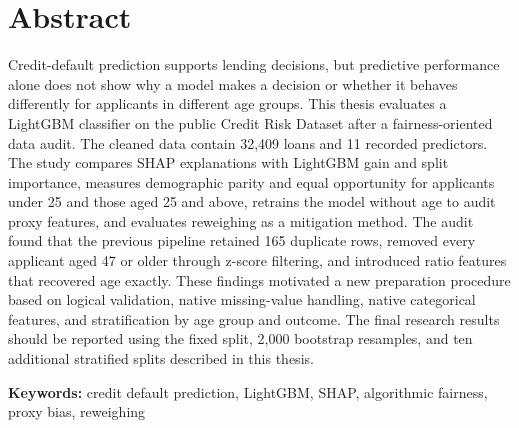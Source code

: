 \chapter*{Abstract}

Credit-default prediction supports lending decisions, but predictive performance
alone does not show why a model makes a decision or whether it behaves
differently for applicants in different age groups. This thesis evaluates a
LightGBM classifier on the public Credit Risk Dataset after a fairness-oriented
data audit. The cleaned data contain 32,409 loans and 11 recorded predictors.
The study compares SHAP explanations with LightGBM gain and split importance,
measures demographic parity and equal opportunity for applicants under 25 and
those aged 25 and above, retrains the model without age to audit proxy features,
and evaluates reweighing as a mitigation method. The audit found that the
previous pipeline retained 165 duplicate rows, removed every applicant aged 47
or older through z-score filtering, and introduced ratio features that recovered
age exactly. These findings motivated a new preparation procedure based on
logical validation, native missing-value handling, native categorical features,
and stratification by age group and outcome. The final research results should
be reported using the fixed split, 2,000 bootstrap resamples, and ten additional
stratified splits described in this thesis.

\vspace{1cm}
\noindent\textbf{Keywords:} credit default prediction, LightGBM, SHAP,
algorithmic fairness, proxy bias, reweighing
